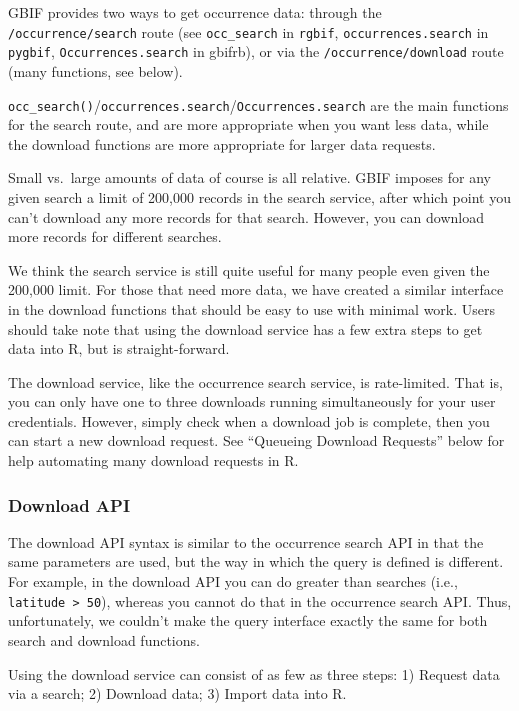 \documentclass[author-year, review, 11pt]{components/elsarticle} %
\begin{document}
GBIF provides two ways to get occurrence data: through the
\texttt{/occurrence/search} route (see \texttt{occ\_search} in
\texttt{rgbif}, \texttt{occurrences.search} in \texttt{pygbif},
\texttt{Occurrences.search} in gbifrb), or via the
\texttt{/occurrence/download} route (many functions, see below).

\texttt{occ\_search()}/\texttt{occurrences.search}/\texttt{Occurrences.search}
are the main functions for the search route, and are more appropriate
when you want less data, while the download functions are more
appropriate for larger data requests.

Small vs.~large amounts of data of course is all relative. GBIF imposes
for any given search a limit of 200,000 records in the search service,
after which point you can't download any more records for that search.
However, you can download more records for different searches.

We think the search service is still quite useful for many people even
given the 200,000 limit. For those that need more data, we have created
a similar interface in the download functions that should be easy to use
with minimal work. Users should take note that using the download
service has a few extra steps to get data into R, but is
straight-forward.

The download service, like the occurrence search service, is
rate-limited. That is, you can only have one to three downloads running
simultaneously for your user credentials. However, simply check when a
download job is complete, then you can start a new download request. See
``Queueing Download Requests'' below for help automating many download
requests in R.

\subsubsection{Download API}\label{download-api}

The download API syntax is similar to the occurrence search API in that
the same parameters are used, but the way in which the query is defined
is different. For example, in the download API you can do greater than
searches (i.e., \texttt{latitude\ \textgreater{}\ 50}), whereas you
cannot do that in the occurrence search API. Thus, unfortunately, we
couldn't make the query interface exactly the same for both search and
download functions.

Using the download service can consist of as few as three steps: 1)
Request data via a search; 2) Download data; 3) Import data into R.
\end{document}
